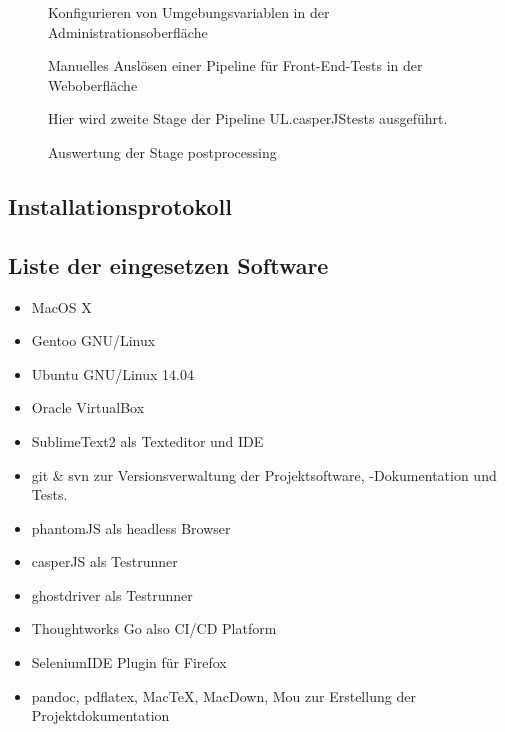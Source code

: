 \begin{figure}[htb]
\centering
{}
\caption{Konfigurieren von Umgebungsvariablen in der Administrationsoberfläche}
\label{fig:goguienvvars}
\end{figure}


 \begin{figure}[htb]
\centering
{}
\caption{Manuelles Auslösen einer Pipeline für Front-End-Tests in der Weboberfläche}
\label{fig:goguitrigger}
\end{figure}



\begin{figure}[htb]
\centering
{}
\caption{  Hier wird zweite Stage der Pipeline UL.casperJStests ausgeführt.}
\label{fig:goguistagedetail}
\end{figure}

\begin{figure}[htb]
\centering

\caption{Auswertung der Stage postprocessing }
\label{fig:goguisummary}
\end{figure}

\clearpage
  \subsection{Installationsprotokoll}\label{installprotocoll}
  
  \clearpage

\subsection{Liste der eingesetzen
Software}\label{liste-der-eingesetzen-software}

\begin{itemize}
\itemsep1pt\parskip0pt
\item
  MacOS X
\item
  Gentoo GNU/Linux
\item
  Ubuntu GNU/Linux 14.04
\item
  Oracle VirtualBox
\item
  SublimeText2 als Texteditor und \acs{IDE}
\item
  git \& svn zur Versionsverwaltung der Projektsoftware, -Dokumentation
  und Tests.
\item
  phantomJS als headless Browser
\item
  casperJS als Testrunner
\item
  ghostdriver als Testrunner
\item
  Thoughtworks Go also CI/CD Platform
\item
  SeleniumIDE Plugin für Firefox
\item
  pandoc, pdflatex, MacTeX, MacDown, Mou zur Erstellung der
  Projektdokumentation
\end{itemize}

